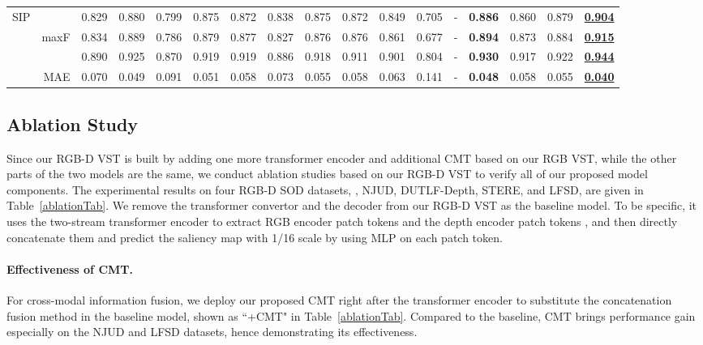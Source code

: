 \documentclass[10pt,twocolumn,letterpaper]{article}
\def\blu#1{\textbf{\color{blue} #1}} \def\red#1{\textbf{\color{red}\underline{#1}}}
\begin{document}
\begin{table*}[t]
\begin{tabular}{lr|cccccccccccccc|c}
  \multirow{4}{*}{SIP}
    &   &0.829 &0.880 &0.799 &0.875 &0.872 &0.838 &0.875 &0.872 &0.849 &0.705 &- &\blu{0.886} &0.860 &0.879 &\red{0.904}\\
    & maxF  &0.834 &0.889 &0.786 &0.879 &0.877 &0.827 &0.876 &0.876 &0.861 &0.677 &- &\blu{0.894} &0.873 &0.884 &\red{0.915}\\
    &   &0.890 &0.925 &0.870 &0.919 &0.919 &0.886 &0.918 &0.911 &0.901 &0.804 &- &\blu{0.930} &0.917 &0.922 &\red{0.944}\\
    \cite{fan2020SIP} & MAE &0.070 &0.049 &0.091 &0.051 &0.058 &0.073 &0.055 &0.058 &0.063 &0.141 &- &\blu{0.048} &0.058 &0.055 &\red{0.040}\\
     \hline

  \end{tabular}
  \label{RGBD_SOTA}
   \vspace{-4mm}
\end{table*}



\subsection{Ablation Study}\label{sec:ablation}
Since our RGB-D VST is built by adding one more transformer encoder and additional CMT based on our RGB VST, while the other parts of the two models are the same, we conduct ablation studies based on our RGB-D VST to verify all of our proposed model components.
The experimental results on four RGB-D SOD datasets, \ie, NJUD, DUTLF-Depth, STERE, and LFSD, are given in Table~\ref{ablationTab}.
We remove the transformer convertor and the decoder from our RGB-D VST as the baseline model. To be specific, it uses the two-stream transformer encoder to extract RGB encoder patch tokens  and the depth encoder patch tokens , and then directly concatenate them and predict the saliency map with 1/16 scale by using MLP on each patch token.

\vspace{-3mm}
\paragraph{Effectiveness of CMT.}
For cross-modal information fusion, we deploy our proposed CMT right after the transformer encoder to substitute the concatenation fusion method in the baseline model, shown as ``+CMT" in Table~\ref{ablationTab}.
Compared to the baseline, CMT brings performance gain especially on the NJUD and LFSD datasets, hence demonstrating its effectiveness.
\end{document}
